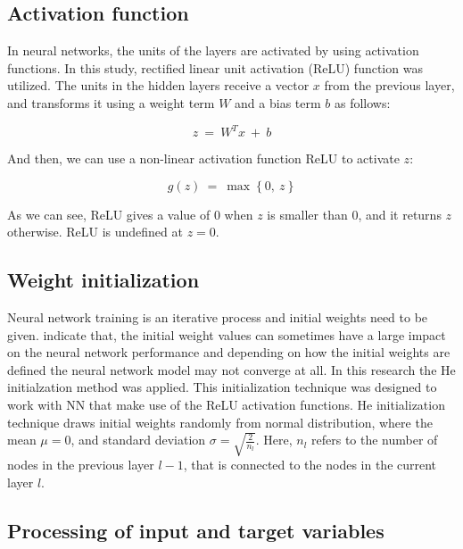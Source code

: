 \documentclass[a4paper, twoside]{templates/ociamthesis}
\begin{document}
\hypertarget{activation-function}{%
\subsection{Activation function}\label{activation-function}}

In neural networks, the units of the layers are activated by using activation functions. In this study, rectified linear unit activation (ReLU) function was utilized. The units in the hidden layers receive a vector \(x\) from the previous layer, and transforms it using a weight term \(W\) and a bias term \(b\) as follows:

\begin{equation}
z\ =\ W^Tx\ +\ b
\label{eq:z}
\end{equation}

And then, we can use a non-linear activation function ReLU to activate \(z\):

\begin{equation}
g\left(z\right)\ =\ \max\left\{0,\ z\right\}
\label{eq:relu}
\end{equation}

As we can see, ReLU gives a value of 0 when \(z\) is smaller than 0, and it returns \(z\) otherwise. ReLU is undefined at \(z = 0\).

\hypertarget{weight-initialization}{%
\subsection{Weight initialization}\label{weight-initialization}}

Neural network training is an iterative process and initial weights need to be given. \citet{goodfellow2016deep} indicate that, the initial weight values can sometimes have a large impact on the neural network performance and depending on how the initial weights are defined the neural network model may not converge at all. In this research the He initialzation \citep{he2015delving} method was applied. This initialization technique was designed to work with NN that make use of the ReLU activation functions. He initialization technique draws initial weights randomly from normal distribution, where the mean \(\mu = 0\), and standard deviation \(\sigma = \sqrt{\frac{2}{n_{l}}}\). Here, \(n_{l}\) refers to the number of nodes in the previous layer \(l - 1\), that is connected to the nodes in the current layer \(l\).

\hypertarget{processing-of-input-and-target-variables}{%
\subsection{Processing of input and target variables}\label{processing-of-input-and-target-variables}}
\end{document}
